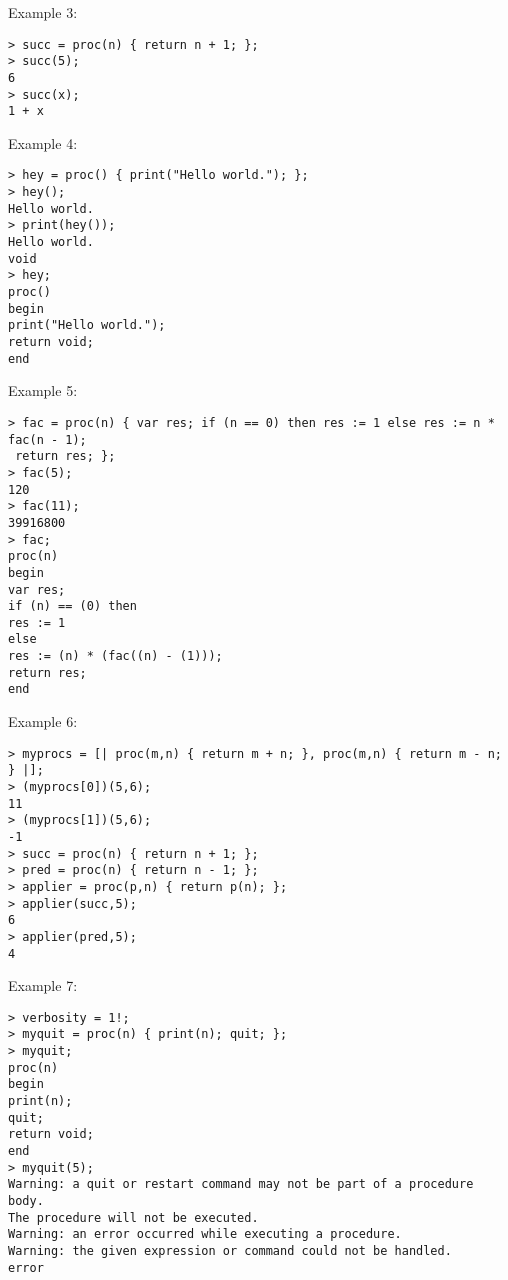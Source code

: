 \noindent Example 3: 
\begin{center}\begin{minipage}{15cm}\begin{Verbatim}[frame=single]
> succ = proc(n) { return n + 1; };
> succ(5);
6
> succ(x);
1 + x
\end{Verbatim}
\end{minipage}\end{center}
\noindent Example 4: 
\begin{center}\begin{minipage}{15cm}\begin{Verbatim}[frame=single]
> hey = proc() { print("Hello world."); };
> hey();
Hello world.
> print(hey());
Hello world.
void
> hey;
proc()
begin
print("Hello world.");
return void;
end
\end{Verbatim}
\end{minipage}\end{center}
\noindent Example 5: 
\begin{center}\begin{minipage}{15cm}\begin{Verbatim}[frame=single]
> fac = proc(n) { var res; if (n == 0) then res := 1 else res := n * fac(n - 1);
 return res; };
> fac(5);
120
> fac(11);
39916800
> fac;
proc(n)
begin
var res;
if (n) == (0) then
res := 1
else
res := (n) * (fac((n) - (1)));
return res;
end
\end{Verbatim}
\end{minipage}\end{center}
\noindent Example 6: 
\begin{center}\begin{minipage}{15cm}\begin{Verbatim}[frame=single]
> myprocs = [| proc(m,n) { return m + n; }, proc(m,n) { return m - n; } |];
> (myprocs[0])(5,6);
11
> (myprocs[1])(5,6);
-1
> succ = proc(n) { return n + 1; };
> pred = proc(n) { return n - 1; };
> applier = proc(p,n) { return p(n); };
> applier(succ,5);
6
> applier(pred,5);
4
\end{Verbatim}
\end{minipage}\end{center}
\noindent Example 7: 
\begin{center}\begin{minipage}{15cm}\begin{Verbatim}[frame=single]
> verbosity = 1!;
> myquit = proc(n) { print(n); quit; };
> myquit;
proc(n)
begin
print(n);
quit;
return void;
end
> myquit(5);
Warning: a quit or restart command may not be part of a procedure body.
The procedure will not be executed.
Warning: an error occurred while executing a procedure.
Warning: the given expression or command could not be handled.
error
\end{Verbatim}
\end{minipage}\end{center}
